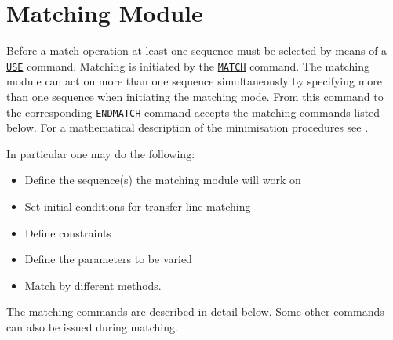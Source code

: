  
\chapter{Matching Module}
\label{chap:match}

Before a match operation at least one sequence must be selected by means
of a \hyperref[sec:use]{\texttt{USE}} command. Matching is 
initiated by the \hyperref[sec:match]{\texttt{MATCH}} command. The matching
module can act on more than one sequence simultaneously by  specifying
more than one sequence when initiating the matching mode.  
From this command to the corresponding
\hyperref[sec:endmatch]{\texttt{ENDMATCH}} command \madx accepts the
matching commands listed below. For a mathematical description of the
minimisation procedures see \cite{MINUIT}. 

In particular one may do the following: 
\begin{itemize}
 \item Define the sequence(s) the matching module will work on 
 \item Set initial conditions for transfer line matching 
 \item Define constraints 
 \item Define the parameters to be varied 
 \item Match by different methods. 
\end{itemize}

The matching commands are described in detail below. Some other commands
can also be issued during matching.  

